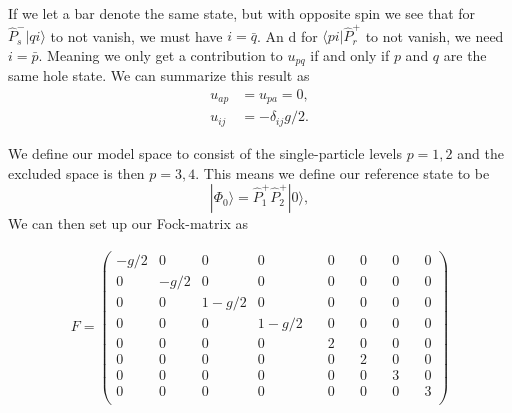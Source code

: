 \documentclass[a4paper, 11pt, notitlepage, english]{article}
\newcommand{\bra}[1]{\langle #1|}
\newcommand{\ket}[1]{|#1 \rangle}
\newcommand{\brakket}[2]{\langle #1 || #2 \rangle}
\newcommand{\op}[1]{\hat{#1}}
\newcommand{\braopket}[3]{\langle #1 | {#2} | #3 \rangle}
\begin{document}
If we let a bar denote the same state, but with opposite spin we see that for $\op{P}^-_s\ket{q i}$ to 
not vanish, we must have $i=\bar{q}$. An
d for $\bra{pi}\op{P}^+_r$ to not vanish, we
 need $i=\bar{p}$. Meaning we only get a contribution to $u_{pq}$ if and only if $p$ and $q$ are the same hole state. We can summarize this result as
\begin{align*}
u_{ap} &= u_{pa} = 0, \\
u_{ij} &= -\delta_{ij} g/2.
\end{align*}


We define our model space to consist of the single-particle levels $p=1,2$ and the excluded space is then $p=3,4$. This means we define our reference state to be
$$\ket{\Phi_0} = \op{P}_1^+ \op{P}_2^+ \ket{0},$$
We can then set up our Fock-matrix as

\begin{align*}
F = 
\begin{pmatrix}
-g/2 & 0 & 0 & 0 & \quad 0 & \quad 0 & \quad 0 & \quad 0 \\
0 & -g/2  & 0 & 0 & \quad 0 & \quad 0 & \quad 0 & \quad 0 \\
0 & 0 & 1-g/2 & 0 & \quad 0 & \quad 0 & \quad 0 & \quad 0 \\
0 & 0 & 0 & 1-g/2 & \quad 0 & \quad 0 & \quad 0 & \quad 0 \\
0 & 0 & 0 & 0 & \quad 2 & \quad 0 & \quad 0 & \quad 0 \\
0 & 0 & 0 & 0 & \quad 0 & \quad 2 & \quad 0 & \quad 0 \\
0 & 0 & 0 & 0 & \quad 0 & \quad 0 & \quad 3 & \quad 0 \\
0 & 0 & 0 & 0 & \quad 0 & \quad 0 & \quad 0 & \quad 3 \\
\end{pmatrix}
\end{align*}









\end{document}
